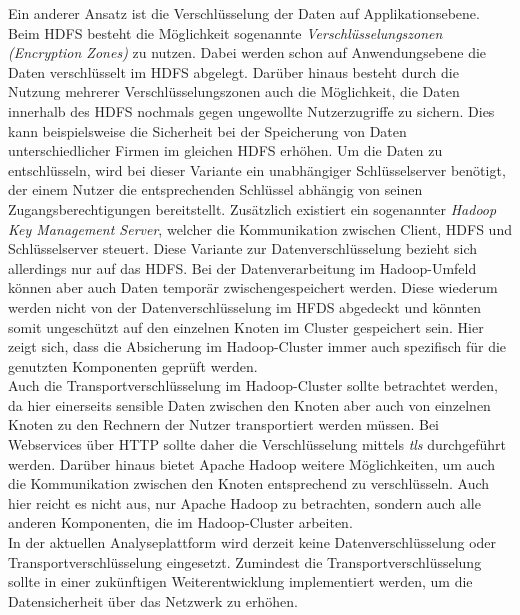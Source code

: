 \noindent
Ein anderer Ansatz ist die Verschlüsselung der Daten auf Applikationsebene. Beim HDFS besteht die Möglichkeit sogenannte \textit{Verschlüsselungszonen (Encryption Zones)} zu nutzen. Dabei werden schon auf Anwendungsebene die Daten verschlüsselt im HDFS abgelegt. Darüber hinaus besteht durch die Nutzung mehrerer Verschlüsselungszonen auch die Möglichkeit, die Daten innerhalb des HDFS nochmals gegen ungewollte Nutzerzugriffe zu sichern. Dies kann beispielsweise die Sicherheit bei der Speicherung von Daten unterschiedlicher Firmen im gleichen HDFS erhöhen. Um die Daten zu entschlüsseln, wird bei dieser Variante ein unabhängiger Schlüsselserver benötigt, der einem Nutzer die entsprechenden Schlüssel abhängig von seinen Zugangsberechtigungen bereitstellt. Zusätzlich existiert ein sogenannter \textit{Hadoop Key Management Server}, welcher die Kommunikation zwischen Client, HDFS und Schlüsselserver steuert.\cite[S. 192-200]{hadoop_security}
Diese Variante zur Datenverschlüsselung bezieht sich allerdings nur auf das HDFS. Bei der Datenverarbeitung im Hadoop-Umfeld können aber auch Daten temporär zwischengespeichert werden. Diese wiederum werden nicht von der Datenverschlüsselung im HFDS abgedeckt und könnten somit ungeschützt auf den einzelnen Knoten im Cluster gespeichert sein. Hier zeigt sich, dass die Absicherung im Hadoop-Cluster immer auch spezifisch für die genutzten Komponenten geprüft werden. \\

\noindent
Auch die Transportverschlüsselung im Hadoop-Cluster sollte betrachtet werden, da hier einerseits sensible Daten zwischen den Knoten aber auch von einzelnen Knoten zu den Rechnern der Nutzer transportiert werden müssen. Bei Webservices über HTTP sollte daher die Verschlüsselung mittels \textit{\gls{tls}} durchgeführt werden. Darüber hinaus bietet Apache Hadoop weitere Möglichkeiten, um auch die Kommunikation zwischen den Knoten entsprechend zu verschlüsseln. Auch hier reicht es nicht aus, nur Apache Hadoop zu betrachten, sondern auch alle anderen Komponenten, die im Hadoop-Cluster arbeiten. \cite[S. 207-216]{hadoop_security}\\

\noindent
In der aktuellen Analyseplattform wird derzeit keine Datenverschlüsselung oder Transportverschlüsselung eingesetzt. Zumindest die Transportverschlüsselung sollte in einer zukünftigen Weiterentwicklung implementiert werden, um die Datensicherheit über das Netzwerk zu erhöhen.

